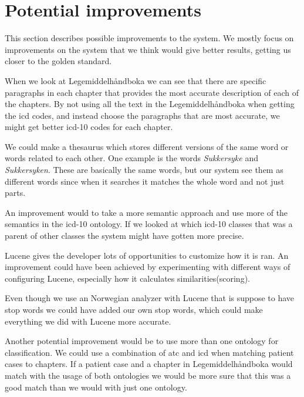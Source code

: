 \chapter{Potential improvements} \label{cha:potential-improvements}

This section describes possible improvements to the system. We mostly focus on
improvements on the system that we think would give better results, getting us
closer to the golden standard.

When we look at Legemiddelhåndboka we can see that there are specific paragraphs
in each chapter that provides the most accurate description of each of the
chapters. By not using all the text in the Legemiddelhåndboka when getting the
icd codes, and instead choose the paragraphs that are most accurate, we might
get better icd-10 codes for each chapter.

We could make a thesaurus which stores different versions of the same word or
words related to each other. One example is the words \emph{Sukkersyke} and
\emph{Sukkersyken}. These are basically the same words, but our system see them as
different words since when it searches it matches the whole word and not just
parts.

An improvement would to take a more semantic approach and use more of the
semantics in the icd-10 ontology. If we looked at which icd-10 classes that was
a parent of other classes the system might have gotten more precise.

Lucene gives the developer lots of opportunities to customize how it is ran. An
improvement could have been achieved by experimenting with different ways of
configuring Lucene, especially how it calculates similarities(scoring).

Even though we use an Norwegian analyzer with Lucene that is suppose to have
stop words we could have added our own stop words, which could make everything we
did with Lucene more accurate.

Another potential improvement would be to use more than one ontology for
classification. We could use a combination of atc and icd when matching
patient cases to chapters. If a patient case and a chapter in Legemiddelhåndboka
would match with the usage of both ontologies we would be more sure that this
was a good match than we would with just one ontology.

